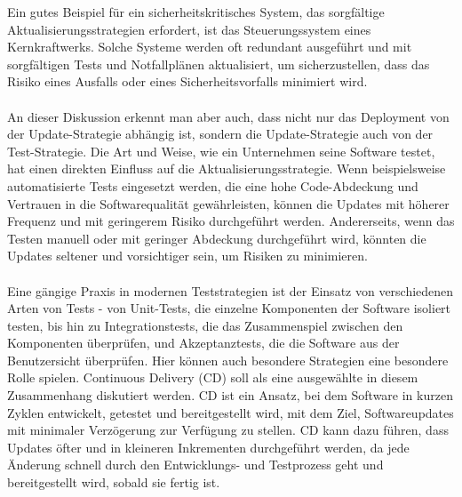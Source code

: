 Ein gutes Beispiel für ein sicherheitskritisches System, das sorgfältige Aktualisierungsstrategien erfordert, ist das Steuerungssystem eines Kernkraftwerks. Solche Systeme werden oft redundant ausgeführt und mit sorgfältigen Tests und Notfallplänen aktualisiert, um sicherzustellen, dass das Risiko eines Ausfalls oder eines Sicherheitsvorfalls minimiert wird. 
\\\\ 
An dieser Diskussion erkennt man aber auch, dass nicht nur das Deployment von der Update-Strategie abhängig ist, sondern die Update-Strategie auch von der Test-Strategie. Die Art und Weise, wie ein Unternehmen seine Software testet, hat einen direkten Einfluss auf die Aktualisierungsstrategie. Wenn beispielsweise automatisierte Tests eingesetzt werden, die eine hohe Code-Abdeckung und Vertrauen in die Softwarequalität gewährleisten, können die Updates mit höherer Frequenz und mit geringerem Risiko durchgeführt werden. Andererseits, wenn das Testen manuell oder mit geringer Abdeckung durchgeführt wird, könnten die Updates seltener und vorsichtiger sein, um Risiken zu minimieren.
\\\\
Eine gängige Praxis in modernen Teststrategien ist der Einsatz von verschiedenen Arten von Tests - von Unit-Tests, die einzelne Komponenten der Software isoliert testen, bis hin zu Integrationstests, die das Zusammenspiel zwischen den Komponenten überprüfen, und Akzeptanztests, die die Software aus der Benutzersicht überprüfen.
Hier können auch besondere Strategien eine besondere Rolle spielen. Continuous Delivery (CD) soll als eine ausgewählte in diesem Zusammenhang diskutiert werden. CD ist ein Ansatz, bei dem Software in kurzen Zyklen entwickelt, getestet und bereitgestellt wird, mit dem Ziel, Softwareupdates mit minimaler Verzögerung zur Verfügung zu stellen. CD kann dazu führen, dass Updates öfter und in kleineren Inkrementen durchgeführt werden, da jede Änderung schnell durch den Entwicklungs- und Testprozess geht und bereitgestellt wird, sobald sie fertig ist.
